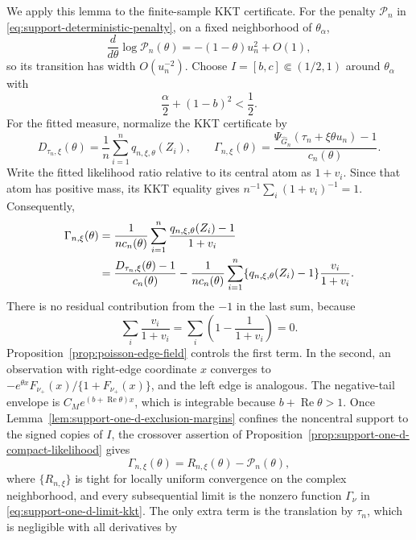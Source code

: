 We apply this lemma to the finite-sample KKT certificate. For the penalty
\(\mathcal P_n\) in \eqref{eq:support-deterministic-penalty}, on a fixed
neighborhood of \(\theta_\alpha\),
\[
    \frac{d}{d\theta}\log \mathcal P_n(\theta)
    =-(1-\theta)u_n^2+O(1),
\]
so its transition has width \(O(u_n^{-2})\). Choose
\(I=[b,c]\Subset(1/2,1)\) around \(\theta_\alpha\) with
\begin{equation}
\label{eq:support-crossover-translation-condition}
    \frac\alpha2+(1-b)^2<\frac12.
\end{equation}
For the fitted measure, normalize the KKT certificate by
\[
    D_{\tau_n,\xi}(\theta)
    =\frac1n\sum_{i=1}^nq_{n,\xi,\theta}(Z_i),
    \qquad
    \Gamma_{n,\xi}(\theta)
    =\frac{\Psi_{\widehat G_n}(\tau_n+\xi\theta u_n)-1}{c_n(\theta)}.
\]
Write the fitted likelihood ratio relative to its central atom as \(1+v_i\).
Since that atom has positive mass, its KKT equality gives
\(n^{-1}\sum_i(1+v_i)^{-1}=1\). Consequently,
\begin{align}
 \Gamma_{n,\xi}(\theta)
 &=\frac1{nc_n(\theta)}\sum_{i=1}^n
   \frac{q_{n,\xi,\theta}(Z_i)-1}{1+v_i}\notag\\
 &=\frac{D_{\tau_n,\xi}(\theta)-1}{c_n(\theta)}
 -\frac1{nc_n(\theta)}\sum_{i=1}^n
   \{q_{n,\xi,\theta}(Z_i)-1\}\frac{v_i}{1+v_i}.
\label{eq:support-finite-kkt-split}
\end{align}
There is no residual contribution from the \(-1\) in the last sum, because
\[
    \sum_i\frac{v_i}{1+v_i}
    =\sum_i\left(1-\frac1{1+v_i}\right)=0.
\]
Proposition~\ref{prop:poisson-edge-field} controls the first term. In the
second, an observation with right-edge coordinate \(x\) converges to
\(-e^{\theta x}F_{\nu_+}(x)/\{1+F_{\nu_+}(x)\}\), and the left edge is
analogous. The negative-tail envelope is
\(C_Me^{(b+\operatorname{Re}\theta)x}\), which is integrable because
\(b+\operatorname{Re}\theta>1\). Once
Lemma~\ref{lem:support-one-d-exclusion-margins} confines the noncentral
support to the signed copies of \(I\), the crossover assertion of
Proposition~\ref{prop:support-one-d-compact-likelihood} gives
\begin{equation}
\label{eq:support-moving-edge-decomposition}
    \Gamma_{n,\xi}(\theta)=R_{n,\xi}(\theta)-\mathcal P_n(\theta),
\end{equation}
where \(\{R_{n,\xi}\}\) is tight for locally uniform convergence on the
complex neighborhood, and every subsequential limit is the nonzero function
\(\Gamma_\nu\) in
\eqref{eq:support-one-d-limit-kkt}. The only extra term is the translation by
\(\tau_n\), which is negligible with all derivatives by
